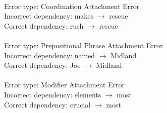 \documentclass[12pt]{article}
\begin{document}
\noindent \textbf{}\\
Error type: Coordination Attachment Error \\
Incorrect dependency: makes $\to$ rescue \\
Correct dependency: rush $\to$ rescue \\
\noindent \textbf{}\\
Error type: Prepositional Phrase Attachment Error \\
Incorrect dependency: named $\to$ Midland \\
Correct dependency: Joe $\to$ Midland \\

\noindent \textbf{}\\
Error type: Modifier Attachment Error \\
Incorrect dependency: elements $\to$ most \\
Correct dependency: crucial $\to$ most \\
\end{document}
